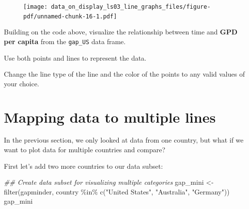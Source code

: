 \documentclass[
  letterpaper,
  DIV=11,
  numbers=noendperiod]{scrreprt}
\newenvironment{Shaded}{\begin{snugshade}}{\end{snugshade}}
\newcommand{\DocumentationTok}[1]{\textcolor[rgb]{0.37,0.37,0.37}{\textit{#1}}}
\newcommand{\FunctionTok}[1]{\textcolor[rgb]{0.28,0.35,0.67}{#1}}
\newcommand{\NormalTok}[1]{\textcolor[rgb]{0.00,0.23,0.31}{#1}}
\newcommand{\OtherTok}[1]{\textcolor[rgb]{0.00,0.23,0.31}{#1}}
\newcommand{\SpecialCharTok}[1]{\textcolor[rgb]{0.37,0.37,0.37}{#1}}
\newcommand{\StringTok}[1]{\textcolor[rgb]{0.13,0.47,0.30}{#1}}
\begin{document}
\begin{figure}[H]

{\centering \texttt{[image: data\_on\_display\_ls03\_line\_graphs\_files/figure-pdf/unnamed-chunk-16-1.pdf]}

}

\end{figure}

\begin{tcolorbox}[enhanced jigsaw, colframe=quarto-callout-tip-color-frame, colbacktitle=quarto-callout-tip-color!10!white, titlerule=0mm, opacitybacktitle=0.6, breakable, toprule=.15mm, arc=.35mm, rightrule=.15mm, colback=white, bottomrule=.15mm, opacityback=0, toptitle=1mm, left=2mm, bottomtitle=1mm, title=\textcolor{quarto-callout-tip-color}{\faLightbulb}\hspace{0.5em}{Practice}, leftrule=.75mm, coltitle=black]

Building on the code above, visualize the relationship between time and
\textbf{GPD per capita} from the \texttt{gap\_US} data frame.

Use both points and lines to represent the data.

Change the line type of the line and the color of the points to any
valid values of your choice.

\end{tcolorbox}

\hypertarget{mapping-data-to-multiple-lines}{%
\section{Mapping data to multiple
lines}\label{mapping-data-to-multiple-lines}}

In the previous section, we only looked at data from one country, but
what if we want to plot data for multiple countries and compare?

First let's add two more countries to our data subset:

\begin{Shaded}
\begin{Highlighting}[]
\DocumentationTok{\#\# Create data subset for visualizing multiple categories}
\NormalTok{gap\_mini }\OtherTok{\textless{}{-}} \FunctionTok{filter}\NormalTok{(gapminder,}
\NormalTok{                   country }\SpecialCharTok{\%in\%} \FunctionTok{c}\NormalTok{(}\StringTok{"United States"}\NormalTok{,}
                                  \StringTok{"Australia"}\NormalTok{,}
                                  \StringTok{"Germany"}\NormalTok{))}
\NormalTok{gap\_mini}
\end{Highlighting}
\end{Shaded}
\end{document}
